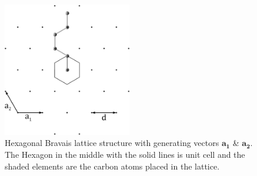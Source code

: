 \begin{figure}
 \centering
 \includegraphics[width=0.5\textwidth]{Figures/hexagon2.eps}
 \caption{Hexagonal Bravais lattice structure with generating vectors $\mathbf{a_{1}}$ \& $\mathbf{a_{2}}$. The Hexagon in the middle with the solid lines is unit cell and the shaded elements are the carbon atoms placed in the lattice.}
 \label{hexagon}
\end{figure}
